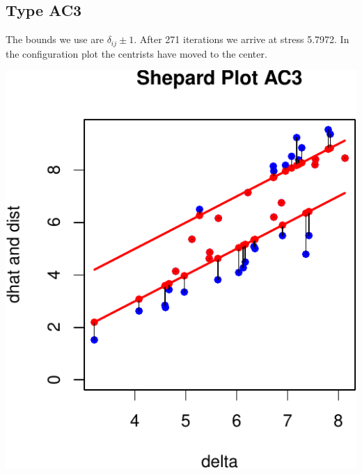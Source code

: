 \documentclass[
  12pt,
]{article}
\begin{document}
\subsection{Type AC3}\label{type-ac3-1}

The bounds we use are \(\delta_{ij}\pm 1\). After 271 iterations
we arrive at stress 5.7972. In the configuration plot the centrists
have moved to the center.

\begin{center}\includegraphics{smacofAC_files/figure-latex/gruijterh01-1} \end{center}
\end{document}
